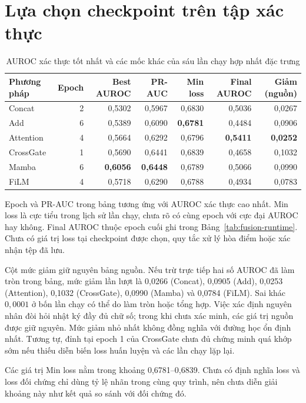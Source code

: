 \documentclass[14pt,a4paper,oneside]{extreport}
\begin{document}
\clearpage
\section{Lựa chọn checkpoint trên tập xác thực}
\begin{table}[htbp]
  \centering
  \caption{AUROC xác thực tốt nhất và các mốc khác của sáu lần chạy hợp nhất đặc trưng}
  \label{tab:fusion-val}
  \setlength{\tabcolsep}{3pt}
  \begin{tabular}{@{}lrrrrrr@{}}
    \toprule
    Phương pháp & Epoch & Best AUROC & PR-AUC & Min loss & Final AUROC & Giảm (nguồn)\\
    \midrule
    Concat & 2 & 0,5302 & 0,5967 & 0,6830 & 0,5036 & 0,0267\\
    Add & 6 & 0,5389 & 0,6090 & \textbf{0,6781} & 0,4484 & 0,0906\\
    Attention & 4 & 0,5664 & 0,6292 & 0,6796 & \textbf{0,5411} & \textbf{0,0252}\\
    CrossGate & 1 & 0,5690 & 0,6441 & 0,6839 & 0,4658 & 0,1032\\
    Mamba & 6 & \textbf{0,6056} & \textbf{0,6448} & 0,6789 & 0,5066 & 0,0990\\
    FiLM & 4 & 0,5718 & 0,6290 & 0,6788 & 0,4934 & 0,0783\\
    \bottomrule
  \end{tabular}
\end{table}
Epoch và PR-AUC trong bảng tương ứng với AUROC xác thực cao nhất.
Min loss là cực tiểu trong lịch sử lần chạy, chưa rõ có cùng epoch với
cực đại AUROC hay không. Final AUROC thuộc epoch cuối ghi trong
Bảng~\ref{tab:fusion-runtime}. Chưa có giá trị loss tại checkpoint
được chọn, quy tắc xử lý hòa điểm hoặc xác nhận tệp đã lưu.

Cột mức giảm giữ nguyên bảng nguồn. Nếu trừ trực tiếp hai số AUROC
đã làm tròn trong bảng, mức giảm lần lượt là 0,0266 (Concat),
0,0905 (Add), 0,0253 (Attention), 0,1032 (CrossGate), 0,0990 (Mamba)
và 0,0784 (FiLM). Sai khác $0{,}0001$ ở bốn lần chạy có thể do làm tròn
hoặc tổng hợp. Việc xác định nguyên nhân đòi hỏi nhật ký đầy đủ chữ số;
trong khi chưa xác minh, các giá trị nguồn được giữ nguyên.
Mức giảm nhỏ nhất không đồng nghĩa với đường học ổn định nhất.
Tương tự, đỉnh tại epoch 1 của CrossGate chưa đủ chứng minh quá khớp
sớm nếu thiếu diễn biến loss huấn luyện và các lần chạy lặp lại.

Các giá trị Min loss nằm trong khoảng 0,6781--0,6839. Chưa có định
nghĩa loss và loss đối chứng chỉ dùng tỷ lệ nhãn trong cùng quy trình,
nên chưa diễn giải khoảng này như kết quả so sánh với đối chứng đó.
\FloatBarrier
\end{document}
